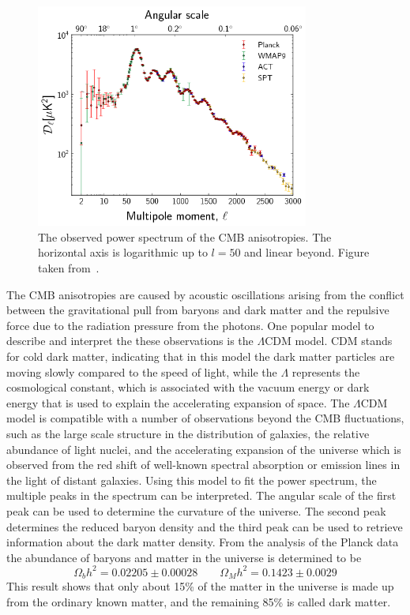 \begin{figure}[ht]
  \centering
  \includegraphics[width=0.8\textwidth]{power_spectrum.png}\hfill%
  \caption{The observed power spectrum of the \ac{CMB} anisotropies. The horizontal axis is logarithmic up to $l = 50$ and linear beyond. Figure taken from~\cite{Ade:2013sjv}.}
  \label{fig:powerspectrum}
\end{figure}

The \ac{CMB} anisotropies are caused by acoustic oscillations arising from the conflict between the gravitational pull from baryons and dark matter and the repulsive force due to the radiation pressure from the photons. One popular model to describe and interpret the these observations is the $\Lambda$CDM model. CDM stands for cold dark matter, indicating that in this model the dark matter particles are moving slowly compared to the speed of light, while the $\Lambda$ represents the cosmological constant, which is associated with the vacuum energy or dark energy that is used to explain the accelerating expansion of space. The $\Lambda$CDM model is compatible with a number of observations beyond the \ac{CMB} fluctuations, such as the large scale structure in the distribution of galaxies, the relative abundance of light nuclei, and the accelerating expansion of the universe which is observed from the red shift of well-known spectral absorption or emission lines in the light of distant galaxies. Using this model to fit the power spectrum, the multiple peaks in the spectrum can be interpreted. The angular scale of the first peak can be used to determine the curvature of the universe. The second peak determines the reduced baryon density and the third peak can be used to retrieve information about the dark matter density. From the analysis of the Planck data the abundance of baryons and matter in the universe is determined to be
\begin{equation}
 \Omega_b h^2 = 0.02205 \pm 0.00028 \qquad \Omega_M h^2 = 0.1423 \pm 0.0029
\end{equation}
This result shows that only about 15\% of the matter in the universe is made up from the ordinary known matter, and the remaining 85\% is called dark matter.

